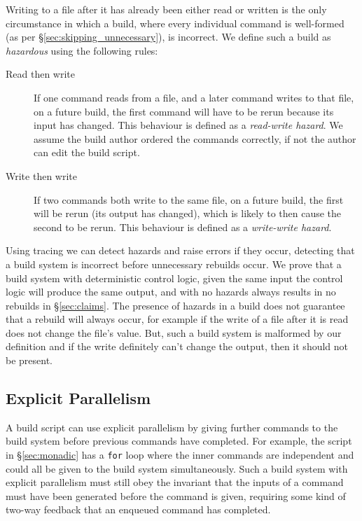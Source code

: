 Writing to a file after it has already been either read or written is the only circumstance in which a build, where every individual command is well-formed (as per \S\ref{sec:skipping_unnecessary}), is incorrect. We define such a build as \emph{hazardous} using the following rules:

\begin{description}
\item[Read then write] If one command reads from a file, and a later command writes to that file, on a future build, the first command will have to be rerun because its input has changed. This behaviour is defined as a \emph{read-write hazard}.  We assume the build author ordered the commands correctly, if not the author can edit the build script.
\item[Write then write] If two commands both write to the same file, on a future build, the first will be rerun (its output has changed), which is likely to then cause the second to be rerun. This behaviour is defined as a \emph{write-write hazard}.
\end{description}

Using tracing we can detect hazards and raise errors if they occur, detecting that a build system is incorrect before unnecessary rebuilds occur. We prove that a build system with deterministic control logic, given the same input the control logic will produce the same output,  and with no hazards always results in no rebuilds in \S\ref{sec:claims}.  The presence of hazards in a build does not guarantee that a rebuild will always occur, for example if the write of a file after it is read does not change the file's value.  But, such a build system is malformed by our definition and if the write definitely can't change the output, then it should not be present.

\subsection{Explicit Parallelism}
\label{sec:explicit_parallelism}

A build script can use explicit parallelism by giving further commands to the build system before previous commands have completed. For example, the script in \S\ref{sec:monadic} has a \texttt{for} loop where the inner commands are independent and could all be given to the build system simultaneously. Such a build system with explicit parallelism must still obey the invariant that the inputs of a command must have been generated before the command is given, requiring some kind of two-way feedback that an enqueued command has completed.

